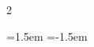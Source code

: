 \documentclass[11pt,a4paper]{memoir}
\begin{document}
\setlength\columnsep{1.5cm}
\begin{multicols}{2}
  \begin{list}{}{\leftmargin=1.5em \itemindent=-1.5em}
      
  \end{list}
\end{multicols}
\end{document}

